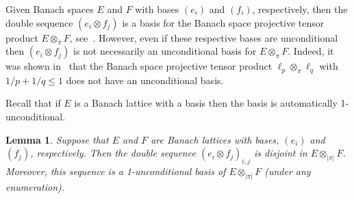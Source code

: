 \documentclass[12pt]{amsart}
\theoremstyle{plain}
\newtheorem{lemma}[theorem]{Lemma}
\theoremstyle{definition}
\newcommand{\abs}[1]{\lvert#1\rvert}
\renewcommand{\le}{\leqslant}
\def\api{{\abs{\!\pi\!}}}
\def\ftp{\otimes_{\!\scriptscriptstyle\api}\!}
\begin{document}
Given Banach spaces $E$ and $F$ with bases $(e_i)$ and $(f_i)$,
respectively, then the double sequence $(e_i\otimes f_j)$ is a basis
for the Banach space projective tensor product $E\otimes_{\pi}F$,
see~\cite{Gelbaum:61}. However, even if these respective bases are
unconditional then $(e_i\otimes f_j)$ is not necessarily an
unconditional basis for $E\otimes_{\pi}F$. Indeed, it was shown
in~\cite{Kwapien:70} that the Banach space projective tensor product
$\ell_p\otimes_{\pi}\ell_q$ with $1/p + 1/q \le 1$ does not have an
unconditional basis.

Recall that if $E$ is a Banach lattice with a basis then the basis is
automatically 1-unconditional.

\begin{lemma}
  Suppose that $E$ and $F$ are Banach lattices with bases, $(e_i)$ and
  $(f_j)$, respectively. Then the double sequence $(e_i\otimes
  f_j)_{i,j}$ is disjoint in $E\ftp F$. Moreover, this sequence is a
  1-unconditional basis of $E\ftp F$ (under any enumeration).
\end{lemma}
\end{document}

